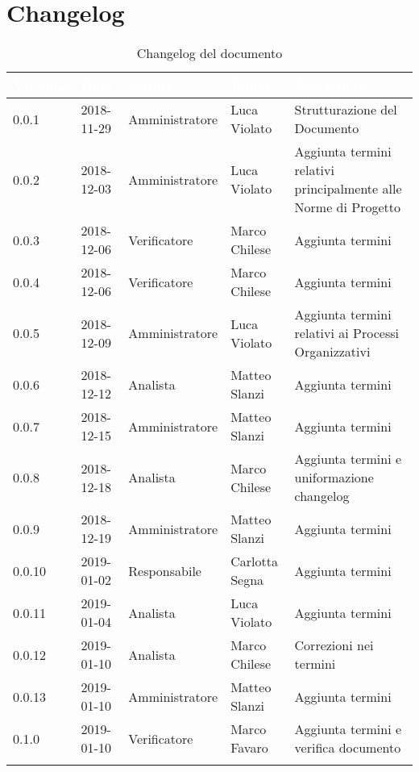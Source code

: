 \section*{Changelog}

\begin{center}
\begin{longtable}[c]{|m{}|m{}|m{}|m{}|p{}|}
\hline
\rowcolor{bluelogo}\textbf{\textcolor{white}{Versione}} & \textbf{\textcolor{white}{Data}} & \textbf{\textcolor{white}{Autore}} & \textbf{\textcolor{white}{Ruolo}} & \textbf{\textcolor{white}{Descrizione}} \\
\hline \hline
\endfirsthead
0.0.1 & 2018-11-29 & Amministratore & Luca Violato & Strutturazione del Documento \\
\hline
\rowcolor{grigio}0.0.2 & 2018-12-03 & Amministratore & Luca Violato & Aggiunta termini relativi principalmente alle Norme di Progetto \\
\hline
0.0.3 & 2018-12-06 & Verificatore  & Marco Chilese & Aggiunta termini\\
\hline 
\rowcolor{grigio}0.0.4 & 2018-12-06 & Verificatore & Marco Chilese & Aggiunta termini\\
\hline
0.0.5 & 2018-12-09 & Amministratore & Luca Violato & Aggiunta termini relativi ai Processi Organizzativi\\
\hline
\rowcolor{grigio}0.0.6 & 2018-12-12 & Analista & Matteo Slanzi & Aggiunta termini\\
\hline
0.0.7 & 2018-12-15 & Amministratore & Matteo Slanzi & Aggiunta termini\\
\hline
\rowcolor{grigio}0.0.8 & 2018-12-18 & Analista & Marco Chilese & Aggiunta termini e uniformazione changelog\\
\hline
0.0.9 & 2018-12-19 & Amministratore & Matteo Slanzi & Aggiunta termini\\
\hline
\rowcolor{grigio} 0.0.10 & 2019-01-02 & Responsabile & Carlotta Segna & Aggiunta termini\\
\hline
0.0.11 & 2019-01-04 & Analista & Luca Violato & Aggiunta termini\\
\hline
\rowcolor{grigio}0.0.12 & 2019-01-10 & Analista & Marco Chilese & Correzioni nei termini\\
\hline
0.0.13 & 2019-01-10 & Amministratore & Matteo Slanzi & Aggiunta termini\\
\hline
\rowcolor{grigio}0.1.0 & 2019-01-10 & Verificatore & Marco Favaro & Aggiunta termini e verifica documento\\
\hline
\caption{Changelog del documento}
\end{longtable}
\end{center}